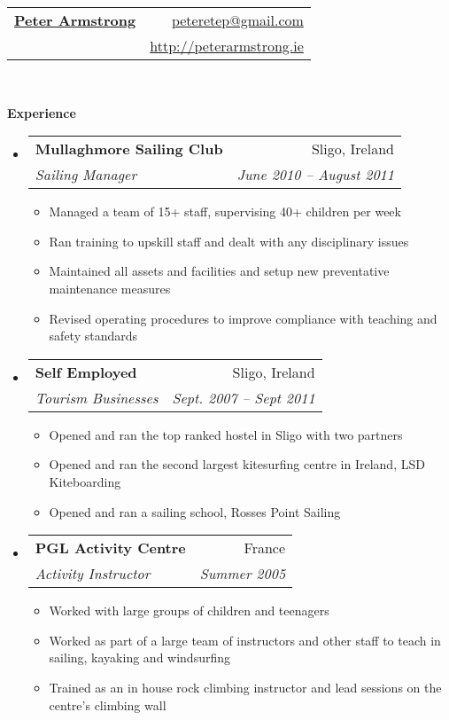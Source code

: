 \documentclass[letterpaper,11pt]{article}
\makeatletter
\newcommand{\resitem}[1]{\item #1 \vspace{-2pt}}
\newcommand{\resheading}[1]{{\large \colorbox{mygrey}{\begin{minipage}{\textwidth}{\textbf{#1 \vphantom{p\^{E}}}}\end{minipage}}}}
\newcommand{\ressubheading}[4]{
\begin{tabular*}{6.5in}{l@{\extracolsep{\fill}}r}
		\textbf{#1} & #2 \\
		\textit{#3} & \textit{#4} \\
\end{tabular*}\vspace{-6pt}}
\makeatother
\begin{document}
\newcommand{\mywebheader}{
\begin{tabular*}{7in}{l@{\extracolsep{\fill}}r}
	\textbf{\href{http://www.peterarmstrong.ie/}{\LARGE Peter Armstrong}} & \href{mailto:peteretep@gmail.com}{peteretep@gmail.com}\\
	& \href{http://www.peterarmstrong.ie}{http://peterarmstrong.ie} \\
	\end{tabular*}
\\
\vspace{0.1in}}

\mywebheader


\resheading{Experience}
	\begin{itemize}        
    \item
        \ressubheading{Mullaghmore Sailing Club}{Sligo, Ireland}{Sailing Manager}{June 2010 -- August 2011}
        {
        \begin{itemize}
        \resitem{Managed a team of 15+ staff, supervising 40+ children per week}
        \resitem{Ran training to upskill staff and dealt with any disciplinary issues}
        \resitem{Maintained all assets and facilities and setup new preventative maintenance measures}
        \resitem{Revised operating procedures to improve compliance with teaching and safety standards}
        \end{itemize}
        }
        
		  \item 
      \ressubheading{Self Employed}{Sligo, Ireland}{Tourism Businesses}{Sept. 2007 -- Sept 2011}
        {
        \begin{itemize}
      	 \resitem{Opened and ran the top ranked hostel in Sligo with two partners}
        \resitem{Opened and ran the second largest kitesurfing centre in Ireland, LSD Kiteboarding}
        \resitem{Opened and ran a sailing school, Rosses Point Sailing}
        \end{itemize}
        }
        
      \item
      \ressubheading{PGL Activity Centre}{France}{Activity Instructor}{Summer 2005}
      {
        \begin{itemize}
        \resitem{Worked with large groups of children and teenagers}
        \resitem{Worked as part of a large team of instructors and other staff to teach in sailing, kayaking and windsurfing}
        \resitem{Trained as an in house rock climbing instructor and lead sessions on the centre's climbing wall}
        \end{itemize}
      }

	\end{itemize}  %
\end{document}
